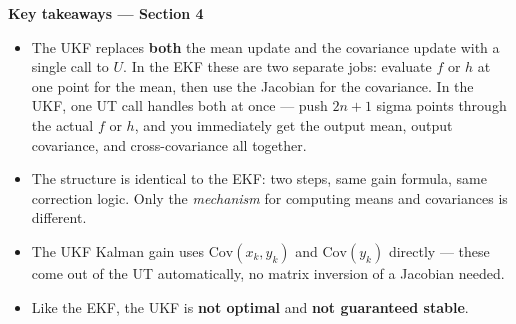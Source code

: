 \documentclass[12pt, a4paper]{article}
\begin{document}
\begin{keybox}
  \textbf{Key takeaways --- Section 4}
  \begin{itemize}[leftmargin=1.4em, topsep=2pt]
    \item The UKF replaces \textbf{both} the mean update and the
          covariance update with a single call to $U$.
          In the EKF these are two separate jobs: evaluate $f$ or $h$
          at one point for the mean, then use the Jacobian for the
          covariance.
          In the UKF, one UT call handles both at once --- push
          $2n+1$ sigma points through the actual $f$ or $h$, and
          you immediately get the output mean, output covariance,
          and cross-covariance all together.
    \item The structure is identical to the EKF:
          two steps, same gain formula, same correction logic.
          Only the \emph{mechanism} for computing means and covariances
          is different.
    \item The UKF Kalman gain uses $\mathrm{Cov}(x_k, y_k)$ and
          $\mathrm{Cov}(y_k)$ directly --- these come out of the UT
          automatically, no matrix inversion of a Jacobian needed.
    \item Like the EKF, the UKF is \textbf{not optimal} and
          \textbf{not guaranteed stable}.
  \end{itemize}
\end{keybox}
\end{document}
